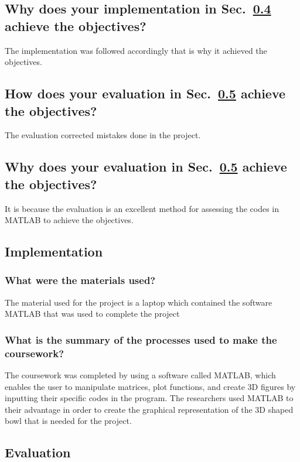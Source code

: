 \subsection{Why does your implementation in Sec.~\ref{sec:implem} achieve the objectives?}
The implementation was followed accordingly that is why it achieved the objectives.
	
\subsection{How does your evaluation in Sec.~\ref{sec:eval} achieve the objectives?}
The evaluation corrected mistakes done in the project.
	
\subsection{Why does your evaluation in Sec.~\ref{sec:eval}  achieve the objectives?}
It is because the evaluation is an excellent method for assessing the codes in MATLAB  to achieve the objectives.




\subsection{Implementation}
\label{sec:implem}




\subsubsection{What were the materials used?}
The material used for the project is a laptop which contained the software MATLAB that was used to complete the project



\subsubsection{What is the summary of the processes used to make the coursework?}
The coursework was completed by using a software called MATLAB, which enables the user to manipulate matrices, plot functions, and create 3D figures by inputting their specific codes in the program. 
The researchers used MATLAB to their advantage in order to create the graphical representation of the 3D shaped bowl that is needed for the project.


\subsection{Evaluation}
\label{sec:eval}

